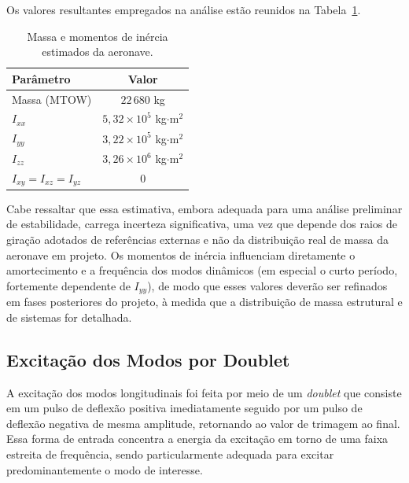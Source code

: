 Os valores resultantes empregados na análise estão reunidos na Tabela~\ref{tab:inercia}.

\begin{table}[H]
    \centering
    \caption{Massa e momentos de inércia estimados da aeronave.}
    \begin{tabular}{|l|c|}
       \hline
       \textbf{Parâmetro} & \textbf{Valor} \\
       \hline
       Massa (MTOW)            & $22\,680$ kg \\
       \hline
       $I_{xx}$                & $5{,}32 \times 10^{5}$ kg$\cdot$m$^2$ \\
       \hline
       $I_{yy}$                & $3{,}22 \times 10^{5}$ kg$\cdot$m$^2$ \\
       \hline
       $I_{zz}$                & $3{,}26 \times 10^{6}$ kg$\cdot$m$^2$ \\
       \hline
       $I_{xy} = I_{xz} = I_{yz}$ & $0$ \\
       \hline
    \end{tabular}
    \label{tab:inercia}
\end{table}

Cabe ressaltar que essa estimativa, embora adequada para uma análise preliminar de estabilidade, carrega incerteza significativa, uma vez que depende dos raios de giração adotados de referências externas e não da distribuição real de massa da aeronave em projeto. Os momentos de inércia influenciam diretamente o amortecimento e a frequência dos modos dinâmicos (em especial o curto período, fortemente dependente de $I_{yy}$), de modo que esses valores deverão ser refinados em fases posteriores do projeto, à medida que a distribuição de massa estrutural e de sistemas for detalhada.


\subsection{Excitação dos Modos por Doublet}

A excitação dos modos longitudinais foi feita por meio de um \textit{doublet} que consiste em um pulso de deflexão positiva imediatamente seguido por um pulso de deflexão negativa de mesma amplitude, retornando ao valor de trimagem ao final. Essa forma de entrada concentra a energia da excitação em torno de uma faixa estreita de frequência, sendo particularmente adequada para excitar predominantemente o modo de interesse.

